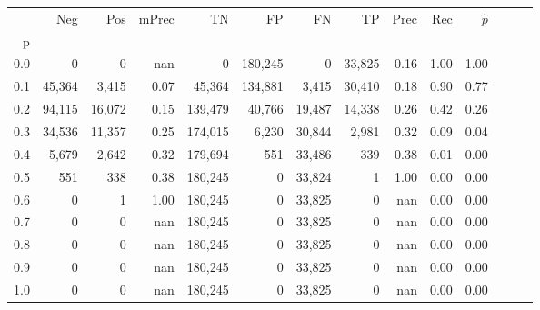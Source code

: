 \begin{tabular}{rrrrrrrrrrrrrr}
\toprule
{} &     Neg &     Pos & mPrec &       TN &       FP &      FN &      TP &  Prec &   Rec & $\hat{p}$ \\
p   &         &         &       &          &          &         &         &       &       &           \\
\midrule
0.0 &       0 &       0 &   nan &        0 &  180,245 &       0 &  33,825 &  0.16 &  1.00 &      1.00 \\
0.1 &  45,364 &   3,415 &  0.07 &   45,364 &  134,881 &   3,415 &  30,410 &  0.18 &  0.90 &      0.77 \\
0.2 &  94,115 &  16,072 &  0.15 &  139,479 &   40,766 &  19,487 &  14,338 &  0.26 &  0.42 &      0.26 \\
0.3 &  34,536 &  11,357 &  0.25 &  174,015 &    6,230 &  30,844 &   2,981 &  0.32 &  0.09 &      0.04 \\
0.4 &   5,679 &   2,642 &  0.32 &  179,694 &      551 &  33,486 &     339 &  0.38 &  0.01 &      0.00 \\
0.5 &     551 &     338 &  0.38 &  180,245 &        0 &  33,824 &       1 &  1.00 &  0.00 &      0.00 \\
0.6 &       0 &       1 &  1.00 &  180,245 &        0 &  33,825 &       0 &   nan &  0.00 &      0.00 \\
0.7 &       0 &       0 &   nan &  180,245 &        0 &  33,825 &       0 &   nan &  0.00 &      0.00 \\
0.8 &       0 &       0 &   nan &  180,245 &        0 &  33,825 &       0 &   nan &  0.00 &      0.00 \\
0.9 &       0 &       0 &   nan &  180,245 &        0 &  33,825 &       0 &   nan &  0.00 &      0.00 \\
1.0 &       0 &       0 &   nan &  180,245 &        0 &  33,825 &       0 &   nan &  0.00 &      0.00 \\
\bottomrule
\end{tabular}
